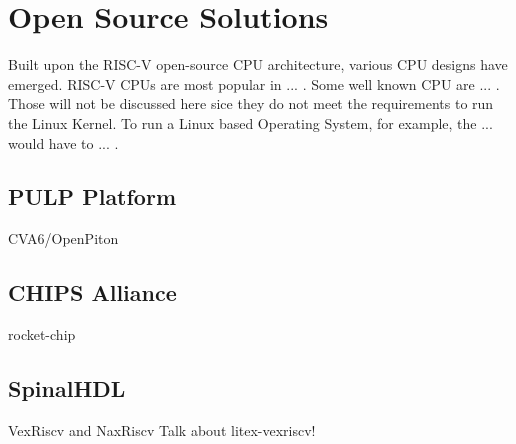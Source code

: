 \section{Open Source Solutions}
Built upon the RISC-V open-source CPU architecture, various CPU designs have emerged. RISC-V CPUs are most popular in ... . Some well known CPU are ... . Those will not be discussed here sice they do not meet the requirements to run the Linux Kernel. To run a Linux based Operating System, for example, the ... would have to ... .

\subsection{PULP Platform}
CVA6/OpenPiton
\subsection{CHIPS Alliance}
rocket-chip
\subsection{SpinalHDL}
VexRiscv and NaxRiscv
Talk about litex-vexriscv!